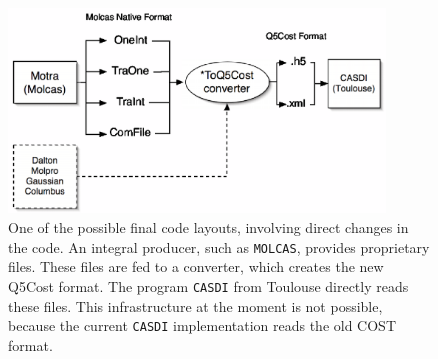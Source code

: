 \begin{center}
\begin{figure}[ht]
\begin{center}
\includegraphics[width=10cm,keepaspectratio]{04_grid/images/q5cost-final-gimped.eps}
\end{center}
\caption{\footnotesize One of the possible final code layouts, involving
direct changes in the code. An integral producer, such as \texttt{MOLCAS}, provides
proprietary files. These files are fed to a converter, which creates the new
Q5Cost format. The program \texttt{CASDI} from Toulouse directly reads these
files. This infrastructure at the moment is not possible, because the
current \texttt{CASDI} implementation reads the old COST format.}
\label{fig:q5cost-final}
\end{figure}
\end{center}
